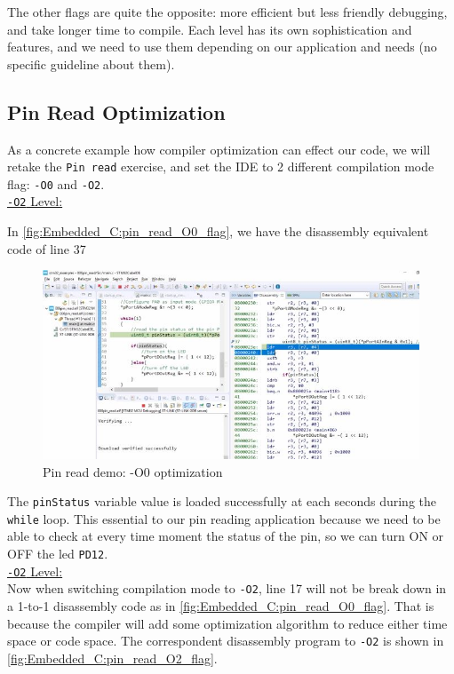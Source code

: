 The other flags are quite the opposite: more efficient but less friendly debugging, and take longer time to compile. Each level has its own sophistication and features, and we need to use them depending on our application and needs (no specific guideline about them).

\newpage
\subsection{Pin Read Optimization}
\label{Sub:Pin_Read_Optimization}

As a concrete example how compiler optimization can effect our code, we will retake the \verb|Pin read| exercise, and set the IDE to 2 different compilation mode flag: \verb|-O0| and \verb|-O2|.\\

\underline{\texttt{-O2} Level:}

In \autoref{fig:Embedded_C:pin_read_O0_flag}, we have the disassembly equivalent code of line 37

\begin{figure}[h]
\centering
\includegraphics[scale=0.7]{Figures/Embedded_C/pin_read_O0_flag}
\caption{Pin read demo: -O0 optimization}
\label{fig:Embedded_C:pin_read_O0_flag}
\end{figure} 

The \verb|pinStatus| variable value is loaded successfully at each seconds during the \verb|while| loop. This essential to our pin reading application because we need to be able to check at every time moment the status of the pin, so we can turn ON or OFF the led \verb|PD12|.\\

\underline{\texttt{-O2} Level:}\\

Now when switching compilation mode to \verb|-O2|, line 17 will not be break down in a 1-to-1 disassembly code as in \autoref{fig:Embedded_C:pin_read_O0_flag}. That is because the compiler will add some optimization algorithm to reduce either time space or code space. The correspondent disassembly program to \verb|-O2| is shown in \autoref{fig:Embedded_C:pin_read_O2_flag}.


